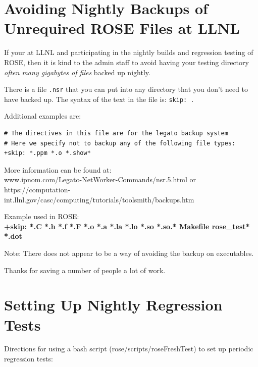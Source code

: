 \section{Avoiding Nightly Backups of Unrequired ROSE Files at LLNL}%

   If your at LLNL and participating in the nightly builds and
regression testing of ROSE, then it is kind to the admin staff
to avoid having your testing directory 
{\em often many gigabytes of files} backed up nightly.

   There is a file {\tt .nsr} that you can put into
any directory that you don't need to have backed up.
The syntax of the text in the file is:
{\tt skip: .}

Additional examples are:
\begin{verbatim}
# The directives in this file are for the legato backup system
# Here we specify not to backup any of the following file types:
+skip: *.ppm *.o *.show*
\end{verbatim}

More information can be found at: \\
   www.ipnom.com/Legato-NetWorker-Commands/nsr.5.html
or \\
   https://computation-int.llnl.gov/casc/computing/tutorials/toolsmith/backups.htm

Example used in ROSE: \\
{\bf +skip: *.C *.h *.f *.F *.o *.a *.la *.lo *.so *.so.* Makefile rose\_test* *.dot}

Note: There does not appear to be a way of avoiding the backup on executables.

Thanks for saving a number of people a lot of work.



\section{Setting Up Nightly Regression Tests}%

Directions for using a bash script (rose/scripts/roseFreshTest) to set up periodic regression tests:

